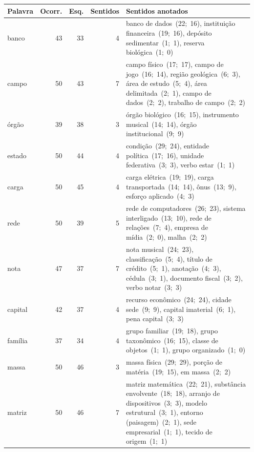 \footnotesize
\setlength{\tabcolsep}{4pt}
\begin{tabularx}{\linewidth}{lrrr>{\raggedright\arraybackslash}X}
\toprule
Palavra & Ocorr. & Esq. & Sentidos & Sentidos anotados \\
\midrule
banco & 43 & 33 & 4 & banco de dados~(22;~16), instituição financeira~(19;~16), depósito sedimentar~(1;~1), reserva biológica~(1;~0) \\
campo & 50 & 43 & 7 & campo físico~(17;~17), campo de jogo~(16;~14), região geológica~(6;~3), área de estudo~(5;~4), área delimitada~(2;~1), campo de dados~(2;~2), trabalho de campo~(2;~2) \\
órgão & 39 & 38 & 3 & órgão biológico~(16;~15), instrumento musical~(14;~14), órgão institucional~(9;~9) \\
estado & 50 & 44 & 4 & condição~(29;~24), entidade política~(17;~16), unidade federativa~(3;~3), verbo estar~(1;~1) \\
carga & 50 & 45 & 4 & carga elétrica~(19;~19), carga transportada~(14;~14), ônus~(13;~9), esforço aplicado~(4;~3) \\
rede & 50 & 39 & 5 & rede de computadores~(26;~23), sistema interligado~(13;~10), rede de relações~(7;~4), empresa de mídia~(2;~0), malha~(2;~2) \\
nota & 47 & 37 & 7 & nota musical~(24;~23), classificação~(5;~4), título de crédito~(5;~1), anotação~(4;~3), cédula~(3;~1), documento fiscal~(3;~2), verbo notar~(3;~3) \\
capital & 42 & 37 & 4 & recurso econômico~(24;~24), cidade sede~(9;~9), capital imaterial~(6;~1), pena capital~(3;~3) \\
família & 37 & 34 & 4 & grupo familiar~(19;~18), grupo taxonômico~(16;~15), classe de objetos~(1;~1), grupo organizado~(1;~0) \\
massa & 50 & 46 & 3 & massa física~(29;~29), porção de matéria~(19;~15), em massa~(2;~2) \\
matriz & 50 & 46 & 7 & matriz matemática~(22;~21), substância envolvente~(18;~18), arranjo de dispositivos~(3;~3), modelo estrutural~(3;~1), entorno (paisagem)~(2;~1), sede empresarial~(1;~1), tecido de origem~(1;~1) \\
\bottomrule
\end{tabularx}

\par{}
